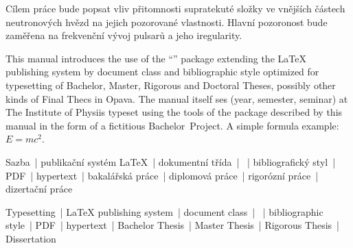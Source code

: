 \documentclass[%
final%
,htext%
]{ipothes}
\begin{document}
\maketitle %


\begin{annotation*}
Cílem práce bude popsat vliv přitomnosti supratekuté složky ve vnějších
 částech neutronových hvězd na jejich pozorované vlastnosti. Hlavní pozoronost 
 bude zaměřena na frekvenční vývoj pulsarů a jeho iregularity.
\end{annotation*}
\begin{annotation}[english]
  This manual introduces the use of the ``\ipotname'' package extending the
  \LaTeX{} publishing system by document class and \BibTeX{} bibliographic
  style optimized for typesetting of Bachelor, Master, Rigorous and Doctoral
  Theses, possibly other kinds of Final Thecs in Opava.  The manual itself ses (year, semester, seminar) at
  The Institute of Physiis typeset using the
  tools of the package described by this manual in the form of a fictitious
  Bachelor~Project. A simple formula example: $E = mc^2$.
\end{annotation}
\begin{keywords}
  Sazba~| publikační systém \LaTeX{}~| dokumentní třída~| \BibTeX{}~|
  bibliografický styl~| PDF~| hypertext~| bakalářská práce~| diplomová práce~|
  rigorózní práce~| dizertační práce
\end{keywords}
\begin{keywords}[english]
  Typesetting~| \LaTeX{} publishing system~| document class~| \BibTeX{}~|
  bibliographic style~| PDF~| hypertext~| Bachelor Thesis~| Master Thesis~|
  Rigorous Thesis~| Dissertation
\end{keywords}

\end{document}
